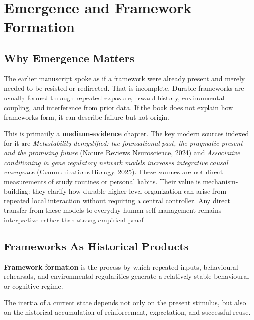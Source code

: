 \chapter{Emergence and Framework Formation}
\label{ch:emergence}

\section{Why Emergence Matters}

The earlier manuscript spoke as if a framework were already present and merely
needed to be resisted or redirected. That is incomplete. Durable frameworks are
usually formed through repeated exposure, reward history, environmental
coupling, and interference from prior data. If the book does not explain how
frameworks form, it can describe failure but not origin.

This is primarily a \textbf{medium-evidence} chapter. The key modern sources
indexed for it are \emph{Metastability demystified: the foundational past, the
pragmatic present and the promising future} (Nature Reviews Neuroscience, 2024)
and \emph{Associative conditioning in gene regulatory network models increases
integrative causal emergence} (Communications Biology, 2025). These sources are
not direct measurements of study routines or personal habits. Their value is
mechanism-building: they clarify how durable higher-level organization can
arise from repeated local interaction without requiring a central controller.
Any direct transfer from these models to everyday human self-management remains
interpretive rather than strong empirical proof.

\section{Frameworks As Historical Products}

\begin{definition}
\textbf{Framework formation} is the process by which repeated inputs,
behavioural rehearsals, and environmental regularities generate a relatively
stable behavioural or cognitive regime.
\end{definition}

\begin{proposition}
The inertia of a current state depends not only on the present stimulus, but
also on the historical accumulation of reinforcement, expectation, and
successful reuse.
\end{proposition}

